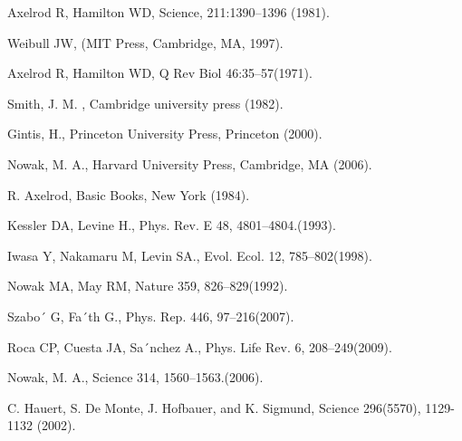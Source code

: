 \documentclass[%
 aip,
 amsmath,amssymb,
 reprint,%
]{revtex4-1}
\begin{document}
\begin{thebibliography}{99}

Axelrod R, Hamilton WD,
\newblock Science, 211:1390–1396 (1981).

Weibull JW,
\newblock (MIT Press, Cambridge, MA, 1997).

Axelrod R, Hamilton WD,
\newblock Q Rev Biol 46:35–57(1971).

Smith, J. M. ,
\newblock Cambridge university press (1982).

Gintis, H.,
\newblock Princeton University Press, Princeton (2000).

Nowak, M. A.,
\newblock Harvard University Press, Cambridge, MA  (2006).

R. Axelrod,
\newblock Basic Books, New York (1984).

Kessler DA, Levine H.,
\newblock Phys. Rev. E 48, 4801–4804.(1993).

Iwasa Y, Nakamaru M, Levin SA.,
\newblock  Evol. Ecol. 12, 785–802(1998).

Nowak MA, May RM,
\newblock  Nature 359, 826–829(1992).

Szabo´ G, Fa´th G.,
\newblock  Phys. Rep. 446, 97–216(2007).

Roca CP, Cuesta JA, Sa´nchez A.,
\newblock  Phys. Life Rev. 6, 208–249(2009).

Nowak, M. A.,
\newblock  Science 314, 1560–1563.(2006).

C. Hauert, S. De Monte, J. Hofbauer, and K. Sigmund,
\newblock  Science 296(5570), 1129-1132 (2002).


\end{thebibliography}
\end{document}
